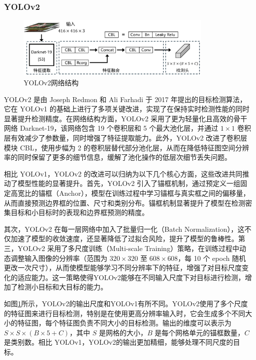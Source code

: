\documentclass[11pt,twocolumn]{ctexart}
\begin{document}
\subsubsection{YOLOv2}

\begin{figure}[!hbtp]
  \begin{center}
  \includegraphics[width=0.85\textwidth]{figure/YOLOv2结构图}
    \end{center}
  \caption{YOLOv2网络结构}
  \label{YOLOV2网络结构}
\end{figure}


YOLOv2\cite{redmon2017yolo9000} 是由 Joseph Redmon 和 Ali Farhadi 于 2017 年提出的目标检测算法，它在 YOLOv1 的基础上进行了多项关键改进，实现了在保持实时检测性能的同时显著提升检测精度。在网络结构方面，YOLOv2 采用了更为轻量化且高效的骨干网络 Darknet-19，该网络包含 19 个卷积层和 5 个最大池化层，并通过 $1 \times 1$ 卷积层有效减少了参数量，同时增强了特征提取能力。此外，YOLOv2 改进了卷积层模块 CBL，使用步幅为 2 的卷积层替代部分池化层，从而在降低特征图空间分辨率的同时保留了更多的细节信息，缓解了池化操作的低层次细节丢失问题。

相比 YOLOv1，YOLOv2 的改进可以归纳为以下几个核心方面，这些改进共同推动了模型性能的显著提升。首先，YOLOv2 引入了锚框机制，通过预定义一组固定高宽比的锚框（Anchor），模型在训练过程中学习锚框与真实框之间的偏移量，从而直接预测边界框的位置、尺寸和类别分布。锚框机制显著提升了模型在检测密集目标和小目标时的表现和边界框预测的精度。

其次，YOLOv2 在每一层网络中加入了批量归一化（Batch Normalization），这不仅加速了模型的收敛速度，还显著降低了过拟合风险，提升了模型的鲁棒性。第三，YOLOv2 采用了多尺度训练（Multi-scale Training）策略，在训练过程中动态调整输入图像的分辨率（范围为 $320 \times 320$ 至 $608 \times 608$，每 10 个 epoch 随机更改一次尺寸），从而使模型能够学习不同分辨率下的特征，增强了对目标尺度变化的适应能力。这一策略使得YOLOv2能够在不同输入尺度下对目标进行检测，增加了检测小目标和大目标的能力。

如图\ref{YOLOV2网络结构}所示，YOLOv2的输出尺度和YOLOv1有所不同。YOLOv2使用了多个尺度的特征图来进行目标检测，特别是在使用更高分辨率输入时，它会生成多个不同大小的特征图，每个特征图负责不同大小的目标检测。输出的维度可以表示为 $S \times S \times (B \times 5 + C)$，其中 $S$ 是网格的大小，$B$ 是每个网格单元的锚框数量，$C$ 是类别数。相比 YOLOv1，YOLOv2的输出更加精细，能够处理不同尺度的目标。
\end{document}
